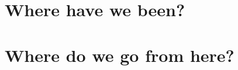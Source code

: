

\frame{}


\section{Where have we been?}
\frame{\tableofcontents[currentsection]}


\section{Where do we go from here?}
\frame{\tableofcontents[currentsection]}



\appendix
\frame{}


